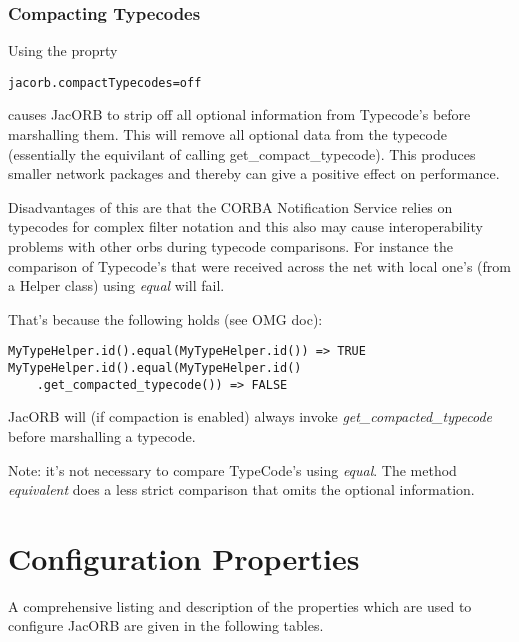 \subsubsection{Compacting Typecodes}
\label{compact-typecode}
Using the proprty
\begin{verbatim}
jacorb.compactTypecodes=off
\end{verbatim}
causes JacORB to strip off all optional information from Typecode's before marshalling them.
This will remove all optional data from the typecode (essentially the equivilant of
calling get\_compact\_typecode). This produces smaller network packages and thereby can give a positive effect on performance.

Disadvantages of this are that the CORBA Notification Service relies on typecodes for complex
filter notation and this also may cause interoperability problems with other orbs during typecode
comparisons. For instance the comparison of Typecode's that were received across the net with
local one's (from a Helper class) using \emph{equal} will fail.

That's because the following holds (see OMG doc):
\begin{verbatim}
MyTypeHelper.id().equal(MyTypeHelper.id()) => TRUE
MyTypeHelper.id().equal(MyTypeHelper.id()
    .get_compacted_typecode()) => FALSE
\end{verbatim}

JacORB will (if compaction is enabled) always invoke \emph{get\_compacted\_typecode} before marshalling a typecode.

Note: it's not necessary to compare TypeCode's using \emph{equal}. The method \emph{equivalent} does a less strict comparison
that omits the optional information.

\section{Configuration Properties}

A comprehensive listing and description of the properties which are used
to configure JacORB are given in the following tables.

